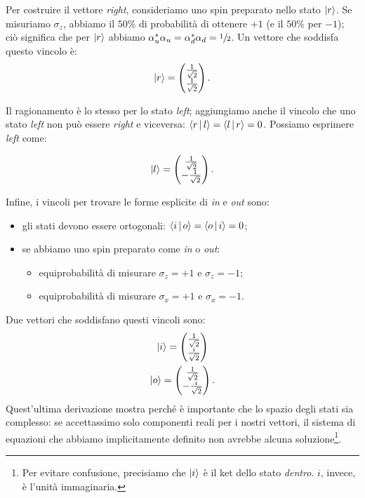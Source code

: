 Per costruire il vettore \emph{right}, consideriamo uno spin preparato nello stato $\Ket{r}$. Se misuriamo $\sigma_z$, abbiamo il $50\%$ di probabilità di ottenere $+1$ (e il $50\%$ per $-1$); ciò significa che per $\Ket{r}$ abbiamo $\alpha_u^*\alpha_u = \alpha_d^*\alpha_d = \sfrac{1}{2}$. Un vettore che soddisfa questo vincolo è:
\begin{equation}
	\Ket{r} = \begin{pmatrix}
		\frac{1}{\sqrt{2}} \\
		\frac{1}{\sqrt{2}}
	\end{pmatrix}.
	\label{eqn:ket_r}
\end{equation}

Il ragionamento è lo stesso per lo stato \emph{left}; aggiungiamo anche il vincolo che uno stato \emph{left} non può essere \emph{right} e viceversa: $\Braket{r|l} = \Braket{l|r} = 0$. Possiamo esprimere \emph{left} come:

\begin{equation}
	\Ket{l} = \begin{pmatrix}
		\frac{1}{\sqrt{2}}\\
		-\frac{1}{\sqrt{2}}
	\end{pmatrix}.
	\label{eqn:ket_l}
\end{equation}

Infine, i vincoli per trovare le forme esplicite di \emph{in} e \emph{out} sono:
\begin{itemize}
	\item gli stati devono essere ortogonali: $\Braket{i|o} = \Braket{o|i} = 0$;
	\item se abbiamo uno spin preparato come \emph{in} o \emph{out}:
	\begin{itemize}
		\item equiprobabilità di misurare $\sigma_z = +1$ e $\sigma_z = -1$;
		\item equiprobabilità di misurare $\sigma_x = +1$ e $\sigma_x = -1$.
	\end{itemize}
\end{itemize}

Due vettori che soddisfano questi vincoli sono:
\begin{gather}
	\Ket{i} = \begin{pmatrix}
		\frac{1}{\sqrt{2}} \\
		\frac{i}{\sqrt{2}}
	\end{pmatrix}
	\label{eqn:ket_i}\\
	\Ket{o} = \begin{pmatrix}
		\frac{1}{\sqrt{2}} \\
		-\frac{i}{\sqrt{2}}
	\end{pmatrix}.
	\label{eqn:ket_o}
\end{gather}
Quest'ultima derivazione mostra perché è importante che lo spazio degli stati sia complesso: se accettassimo solo componenti reali per i nostri vettori, il sistema di equazioni che abbiamo implicitamente definito non avrebbe alcuna soluzione\footnote{Per evitare confusione, precisiamo che $\Ket{i}$ è il ket dello stato \emph{dentro}. $i$, invece, è l'unità immaginaria.}.

